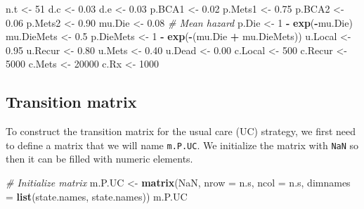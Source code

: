 \documentclass[]{article}
\newenvironment{Shaded}{\begin{snugshade}}{\end{snugshade}}
\newcommand{\KeywordTok}[1]{\textcolor[rgb]{0.13,0.29,0.53}{\textbf{#1}}}
\newcommand{\DataTypeTok}[1]{\textcolor[rgb]{0.13,0.29,0.53}{#1}}
\newcommand{\DecValTok}[1]{\textcolor[rgb]{0.00,0.00,0.81}{#1}}
\newcommand{\FloatTok}[1]{\textcolor[rgb]{0.00,0.00,0.81}{#1}}
\newcommand{\StringTok}[1]{\textcolor[rgb]{0.31,0.60,0.02}{#1}}
\newcommand{\CommentTok}[1]{\textcolor[rgb]{0.56,0.35,0.01}{\textit{#1}}}
\newcommand{\OtherTok}[1]{\textcolor[rgb]{0.56,0.35,0.01}{#1}}
\newcommand{\OperatorTok}[1]{\textcolor[rgb]{0.81,0.36,0.00}{\textbf{#1}}}
\newcommand{\NormalTok}[1]{#1}
\theoremstyle{definition}
\theoremstyle{definition}
\theoremstyle{definition}
\theoremstyle{remark}
\begin{document}
\begin{Shaded}
\begin{Highlighting}[]
\NormalTok{n.t        <-}\StringTok{ }\DecValTok{51}
\NormalTok{d.c        <-}\StringTok{ }\FloatTok{0.03}
\NormalTok{d.e        <-}\StringTok{ }\FloatTok{0.03}
\NormalTok{p.BCA1     <-}\StringTok{ }\FloatTok{0.02}
\NormalTok{p.Mets1    <-}\StringTok{ }\FloatTok{0.75}
\NormalTok{p.BCA2     <-}\StringTok{ }\FloatTok{0.06}
\NormalTok{p.Mets2    <-}\StringTok{ }\FloatTok{0.90}
\NormalTok{mu.Die     <-}\StringTok{ }\FloatTok{0.08} \CommentTok{# Mean hazard}
\NormalTok{p.Die      <-}\StringTok{ }\DecValTok{1} \OperatorTok{-}\StringTok{ }\KeywordTok{exp}\NormalTok{(}\OperatorTok{-}\NormalTok{mu.Die)}
\NormalTok{mu.DieMets <-}\StringTok{ }\FloatTok{0.5}
\NormalTok{p.DieMets  <-}\StringTok{ }\DecValTok{1} \OperatorTok{-}\StringTok{ }\KeywordTok{exp}\NormalTok{(}\OperatorTok{-}\NormalTok{(mu.Die }\OperatorTok{+}\StringTok{ }\NormalTok{mu.DieMets))}
\NormalTok{u.Local    <-}\StringTok{ }\FloatTok{0.95}
\NormalTok{u.Recur    <-}\StringTok{ }\FloatTok{0.80}
\NormalTok{u.Mets     <-}\StringTok{ }\FloatTok{0.40}
\NormalTok{u.Dead     <-}\StringTok{ }\FloatTok{0.00}
\NormalTok{c.Local    <-}\StringTok{ }\DecValTok{500}
\NormalTok{c.Recur    <-}\StringTok{ }\DecValTok{5000}
\NormalTok{c.Mets     <-}\StringTok{ }\DecValTok{20000}
\NormalTok{c.Rx       <-}\StringTok{ }\DecValTok{1000}
\end{Highlighting}
\end{Shaded}

\subsection{Transition matrix}\label{transition-matrix}

To construct the transition matrix for the usual care (UC) strategy, we
first need to define a matrix that we will name \texttt{m.P.UC}. We
initialize the matrix with \texttt{NaN} so then it can be filled with
numeric elements.

\begin{Shaded}
\begin{Highlighting}[]
\CommentTok{# Initialize matrix}
\NormalTok{m.P.UC <-}\StringTok{ }\KeywordTok{matrix}\NormalTok{(}\OtherTok{NaN}\NormalTok{, }
                 \DataTypeTok{nrow =}\NormalTok{ n.s, }\DataTypeTok{ncol =}\NormalTok{ n.s, }
                 \DataTypeTok{dimnames =} \KeywordTok{list}\NormalTok{(state.names, state.names))}
\NormalTok{m.P.UC}
\end{Highlighting}
\end{Shaded}
\end{document}
